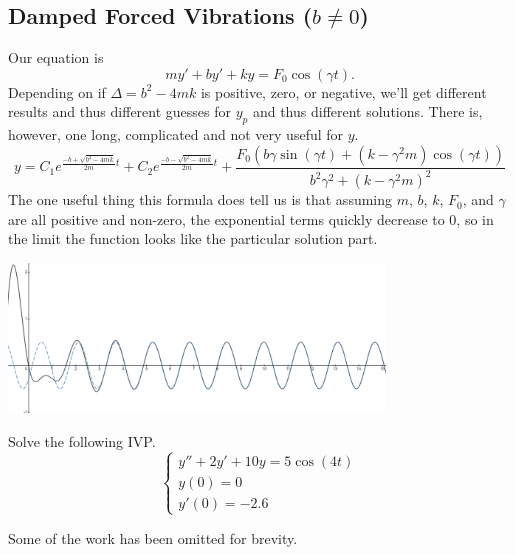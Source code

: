 \subsection{Damped Forced Vibrations ($b \neq 0$)}
\noindent
Our equation is 
\begin{equation*}
	my' + by' + ky = F_0\cos{(\gamma t)}.
\end{equation*}
Depending on if $\Delta = b^2 - 4mk$ is positive, zero, or negative, we'll get different results and thus different guesses for $y_p$ and thus different solutions.
There is, however, one long, complicated and not very useful for $y$.
\begin{equation*}
	y = C_1e^{\frac{-b+\sqrt{b^2-4mk}}{2m}t} + C_2e^{\frac{-b-\sqrt{b^2-4mk}}{2m}t} +
	 \frac{F_0\left(b\gamma\sin{(\gamma t)} + \left(k-\gamma^2m\right)\cos{(\gamma t)}\right)}{b^2\gamma^2 + (k-\gamma^2m)^2}
\end{equation*}
The one useful thing this formula does tell us is that assuming $m$, $b$, $k$, $F_0$, and $\gamma$ are all positive and non-zero, the exponential terms quickly decrease to 0, so in the limit the function looks like the particular solution part.

\begin{center}
	\includegraphics[width=0.75\textwidth]{./higherOrder/forcedVibrs/damped_forced.png}
\end{center}

\begin{example}
	Solve the following IVP.
	\begin{equation*}
		\begin{cases}
			y'' + 2y' + 10y = 5\cos{(4t)} \\
			y(0) = 0 \\
			y'(0) = -2.6
		\end{cases}
	\end{equation*}
\end{example}
\noindent
Some of the work has been omitted for brevity.

